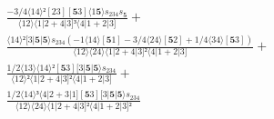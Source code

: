 \documentclass[varwidth, border=5pt]{standalone}
\begin{document}
\begin{my}
$\begin{gathered}
\scriptscriptstyle\frac{-3/4⟨14⟩²[23][𝟓3]⟨1𝟓⟩s_{234}s_{𝟓}}{⟨12⟩⟨1|2+4|3]³⟨4|1+2|3]} +\\
\scriptscriptstyle\frac{⟨14⟩²[3|𝟓|𝟓⟩s_{234}(-1⟨14⟩[𝟓1]-3/4⟨24⟩[𝟓2]+1/4⟨34⟩[𝟓3])}{⟨12⟩⟨24⟩⟨1|2+4|3]²⟨4|1+2|3]} +\\
\scriptscriptstyle\frac{1/2⟨13⟩⟨14⟩²[𝟓3][3|𝟓|𝟓⟩s_{234}}{⟨12⟩²⟨1|2+4|3]²⟨4|1+2|3]} +\\
\scriptscriptstyle\frac{1/2⟨14⟩³⟨4|2+3|1][𝟓3][3|𝟓|𝟓⟩s_{234}}{⟨12⟩⟨24⟩⟨1|2+4|3]²⟨4|1+2|3]²} \phantom{+}
\end{gathered}$
\end{my}
\end{document}

